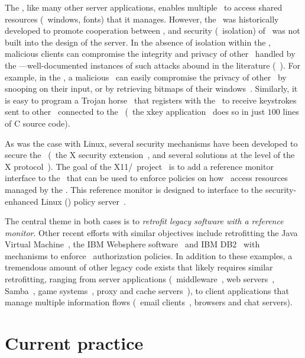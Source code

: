 The \xserver, like many other server applications, enables multiple \xclients\
to access shared resources (\eg~windows, fonts) that it manages. However, the
\xserver\ was historically developed to promote cooperation between \xclients,
and security (\eg~isolation) of \xclients\ was not built into the design of the
server. In the absence of isolation within the \xserver, malicious clients can
compromise the integrity and privacy of other \xclients\ handled by the
\xserver---well-documented instances of such attacks abound in the literature
(\eg~\cite{ep91,ksv03,k04,w96a}). For example, in the \xserver, a malicious
\xclient\ can easily compromise the privacy of other \xclients\ by snooping on
their input, or by retrieving bitmaps of their windows~\cite{ksv03}. Similarly,
it is easy to program a Trojan horse \xclient\ that registers with the
\xserver\ to receive keystrokes sent to other \xclients\ connected to the
\xserver~(\eg~the xkey application~\cite{xkey} does so in just $100$
lines of C source code).

As was the case with Linux, several security mechanisms have been developed to
secure the \xserver\ (\eg~the X security extension~\cite{w96b}, and several
solutions at the level of the X protocol~\cite{dru05,w96a}).  The goal of the
X11/\selinux\ project~\cite{ksv03,w07} is to add a reference monitor interface
to the \xserver\ that can be used to enforce policies on how \xclients\ access
resources managed by the \xserver. This reference monitor is designed to
interface to the security-enhanced Linux (\selinux) policy server~\cite{ksv03}.

The central theme in both cases is to \textit{retrofit legacy software with a
reference monitor}. Other recent efforts with similar objectives include
retrofitting the Java Virtual Machine~\cite{f06}, the IBM Websphere
software~\cite{hms06,s07} and IBM DB2~\cite{s07} with mechanisms to enforce
\selinux\ authorization policies.  In addition to these examples, a tremendous
amount of other legacy code exists that likely requires similar retrofitting,
ranging from server applications (\eg~middleware~\cite{jdbc,odbc}, web
servers~\cite{apache,iis}, Samba~\cite{samba}, game systems~\cite{games}, proxy
and cache servers~\cite{squid}), to client applications that manage multiple
information flows (\eg~email clients~\cite{ham06}, browsers and chat servers).  


\section{Current practice}
\label{chapter:introduction:state-of-the-art}

